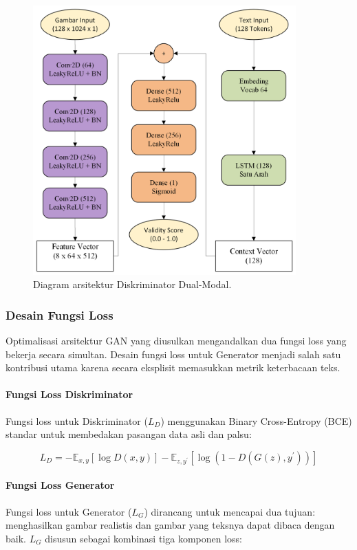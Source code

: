 \documentclass[12pt,a4paper]{article}
\begin{document}
\begin{figure}[H]
\centering
\includegraphics[width=0.9\textwidth]{images/dual-modal.png}
\caption{Diagram arsitektur Diskriminator Dual-Modal.}
\label{fig:dual-modal}
\end{figure}

\subsubsection{Desain Fungsi Loss} %

Optimalisasi arsitektur GAN yang diusulkan mengandalkan dua fungsi loss yang bekerja secara simultan. Desain fungsi loss untuk Generator menjadi salah satu kontribusi utama karena secara eksplisit memasukkan metrik keterbacaan teks.

\paragraph{Fungsi Loss Diskriminator}
Fungsi loss untuk Diskriminator ($L_D$) menggunakan Binary Cross-Entropy (BCE) standar untuk membedakan pasangan data asli dan palsu:

\begin{equation}
L_D = -\mathbb{E}_{x,y}[\log D(x, y)] - \mathbb{E}_{z,y^{\prime}}[\log(1 - D(G(z), y^{\prime}))]
\end{equation}

\paragraph{Fungsi Loss Generator}
Fungsi loss untuk Generator ($L_G$) dirancang untuk mencapai dua tujuan: menghasilkan gambar realistis dan gambar yang teksnya dapat dibaca dengan baik. $L_G$ disusun sebagai kombinasi tiga komponen loss:
\end{document}
